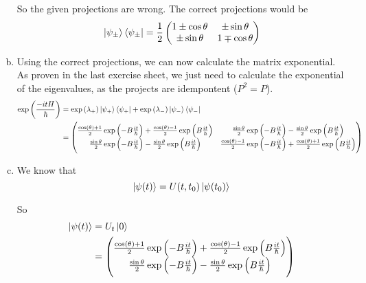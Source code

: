\documentclass[a4paper,german,12pt,smallheadings]{scrartcl}
\begin{document}
\begin{enumerate}[a)]
    So the given projections are wrong. The correct projections would be
    \begin{equation*}
      \ket{\psi_\pm} \bra{\psi_\pm} = \frac{1}{2} \begin{pmatrix}
        1 \pm \cos \theta & \pm \sin \theta \\
        \pm \sin \theta & 1 \mp \cos \theta
      \end{pmatrix}
    \end{equation*}
  \item
    Using the correct projections, we can now calculate the matrix exponential.
    As proven in the last exercise sheet, we just need to calculate the
    exponential of the eigenvalues, as the projects are idempontent ($P^2 =
    P$).
    \begin{align*}
      \exp\del{\frac{-itH}{\hbar}} &= \exp\del{\lambda_+} \ket{\psi_+}\bra{\psi_+} + \exp\del{\lambda_-} \ket{\psi_-}\bra{\psi_-} \\
                                   &= 
      \begin{pmatrix}
        \frac{\cos(\theta) + 1}{2} \exp\del{-B\frac{it}{\hbar}} + \frac{\cos(\theta) - 1}{2} \exp\del{B\frac{it}{\hbar}} &
        \frac{\sin\theta}{2} \exp\del{-B\frac{it}{\hbar}} - \frac{\sin\theta}{2} \exp\del{B\frac{it}{\hbar}} \\
        \frac{\sin\theta}{2} \exp\del{-B\frac{it}{\hbar}} - \frac{\sin\theta}{2} \exp\del{B\frac{it}{\hbar}} &
        \frac{\cos(\theta) - 1}{2} \exp\del{-B\frac{it}{\hbar}} + \frac{\cos(\theta) + 1}{2} \exp\del{B\frac{it}{\hbar}}
      \end{pmatrix}
    \end{align*}
  \item
    We know that
    \begin{equation*}
      \ket{\psi(t)} = U(t,t_0) \ket{\psi(t_0)}
    \end{equation*}

    So
    \begin{align*}
      \ket{\psi(t)} &= U_t \ket{0} \\
                    &= 
      \begin{pmatrix}
        \frac{\cos(\theta) + 1}{2} \exp\del{-B\frac{it}{\hbar}} + \frac{\cos(\theta) - 1}{2} \exp\del{B\frac{it}{\hbar}} \\
        \frac{\sin\theta}{2} \exp\del{-B\frac{it}{\hbar}} - \frac{\sin\theta}{2} \exp\del{B\frac{it}{\hbar}}
      \end{pmatrix}
    \end{align*}


\end{enumerate}
\end{document}
